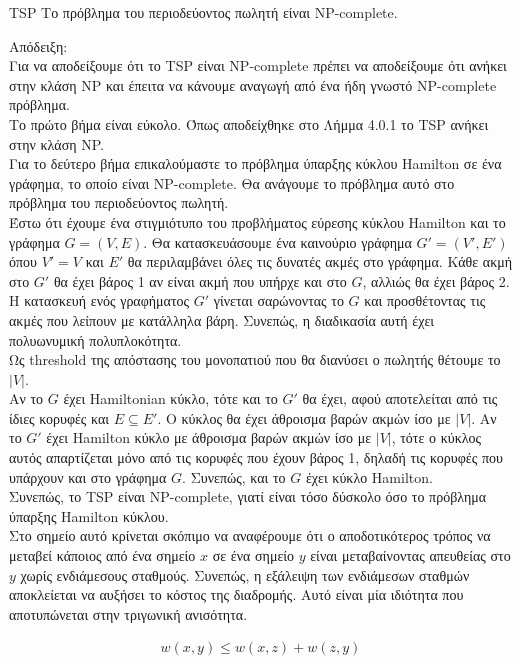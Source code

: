 \documentclass[oneside,12pt]{book}
\theoremstyle{definition}
\begin{document}
\begin{mylemma}{TSP}{}
	Tο πρόβλημα του περιοδεύοντος πωλητή είναι NP-complete.	
\end{mylemma}

Απόδειξη: \\
Για να αποδείξουμε ότι το TSP είναι NP-complete πρέπει να αποδείξουμε ότι ανήκει στην κλάση NP και έπειτα να κάνουμε αναγωγή από ένα ήδη γνωστό NP-complete πρόβλημα. \\
Το πρώτο βήμα είναι εύκολο. Όπως αποδείχθηκε στο Λήμμα 4.0.1 το TSP ανήκει στην κλάση NP. \\
Για το δεύτερο βήμα επικαλούμαστε το πρόβλημα ύπαρξης κύκλου Hamilton σε ένα γράφημα, το οποίο είναι NP-complete. Θα ανάγουμε το πρόβλημα αυτό στο πρόβλημα του περιοδεύοντος πωλητή. \\
Έστω ότι έχουμε ένα στιγμιότυπο του προβλήματος εύρεσης κύκλου Hamilton και το γράφημα \(G = (V,E)\). Θα κατασκευάσουμε ένα καινούριο γράφημα \(G' = (V',E')\) όπου \(V' = V\) και \(E'\) θα περιλαμβάνει όλες τις δυνατές ακμές στο γράφημα. Κάθε ακμή στο \(G'\) θα έχει βάρος 1 αν είναι ακμή που υπήρχε και στο \(G\), αλλιώς θα έχει βάρος 2. Η κατασκευή ενός γραφήματος \(G'\) γίνεται σαρώνοντας το \(G\) και προσθέτοντας τις ακμές που λείπουν με κατάλληλα βάρη. Συνεπώς, η διαδικασία αυτή έχει πολυωνυμική πολυπλοκότητα. \\
Ως threshold της απόστασης του μονοπατιού που θα διανύσει ο πωλητής θέτουμε το \(|V|\). \\
Αν το \(G\) έχει Hamiltonian κύκλο, τότε και το \(G'\) θα έχει, αφού αποτελείται από τις ίδιες κορυφές και \(Ε \subseteq E'\). Ο κύκλος θα έχει άθροισμα βαρών ακμών ίσο με \(|V|\).
Αν το \(G'\) έχει Hamilton κύκλο με άθροισμα βαρών ακμών ίσο με \(|V|\), τότε ο κύκλος αυτός απαρτίζεται μόνο από τις κορυφές που έχουν βάρος 1, δηλαδή τις κορυφές που υπάρχουν και στο γράφημα \(G\). Συνεπώς, και το \(G\) έχει κύκλο Hamilton. \\
Συνεπώς, το TSP είναι NP-complete, γιατί είναι τόσο δύσκολο όσο το πρόβλημα ύπαρξης Hamilton κύκλου. \\

Στο σημείο αυτό κρίνεται σκόπιμο να αναφέρουμε ότι ο αποδοτικότερος τρόπος να μεταβεί κάποιος από ένα σημείο \(x\) σε ένα σημείο \(y\) είναι μεταβαίνοντας απευθείας στο \(y\) χωρίς ενδιάμεσους σταθμούς. Συνεπώς, η εξάλειψη των ενδιάμεσων σταθμών αποκλείεται να αυξήσει το κόστος της διαδρομής. Αυτό είναι μία ιδιότητα που αποτυπώνεται στην τριγωνική ανισότητα. 

\begin{align*}
	w(x,y) \leq w(x,z) + w(z,y)
\end{align*}
\end{document}

